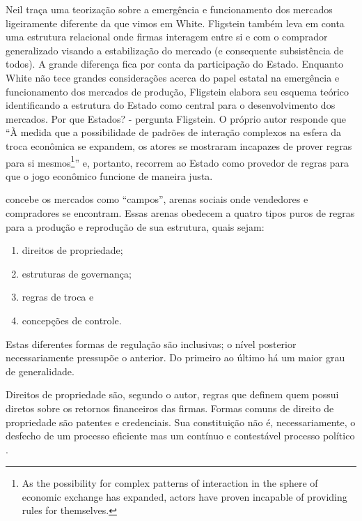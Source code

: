 \documentclass[a4paper, 12pt, openright, oneside, german, french, english, brazil]{abntex2}
\begin{document}
	Neil  traça uma teorização sobre a emergência e funcionamento dos mercados ligeiramente diferente da que vimos em White. Fligstein também leva em conta uma estrutura relacional onde firmas interagem entre si e com o comprador generalizado visando a estabilização do mercado (e consequente subsistência de todos). A grande diferença fica por conta da participação do Estado. Enquanto White não tece grandes considerações acerca do papel estatal na emergência e funcionamento dos mercados de produção, Fligstein elabora seu esquema teórico identificando a estrutura do Estado como central para o desenvolvimento dos mercados. Por que Estados? - pergunta Fligstein. O próprio autor responde que ``À medida que a possibilidade de padrões de interação complexos na esfera da troca econômica se expandem, os atores se mostraram incapazes de prover regras para si mesmos\footnote{As the possibility for complex patterns of interaction in the sphere of economic exchange has expanded, actors have proven incapable of providing rules for themselves.}'' \cite[p. 27-8]{fligstein2002architecture} e, portanto, recorrem ao Estado como provedor de regras para que o jogo econômico funcione de maneira justa.

	 concebe os mercados como ``campos'', arenas sociais onde vendedores e compradores se encontram. Essas arenas obedecem a quatro tipos puros de regras para a produção e reprodução de sua estrutura, quais sejam:

	\begin{enumerate}
		\item direitos de propriedade;
		\item estruturas de governança;
		\item regras de troca e
		\item concepções de controle.
	\end{enumerate}

	Estas diferentes formas de regulação são inclusivas; o nível posterior necessariamente pressupõe o anterior. Do primeiro ao último há um maior grau de generalidade.

	Direitos de propriedade são, segundo o autor, regras que definem quem possui diretos sobre os retornos financeiros das firmas. Formas comuns de direito de propriedade são patentes e credenciais. Sua constituição não é, necessariamente, o desfecho de um processo eficiente mas um contínuo e contestável processo político \cite{fligstein2002architecture}.
\end{document}
